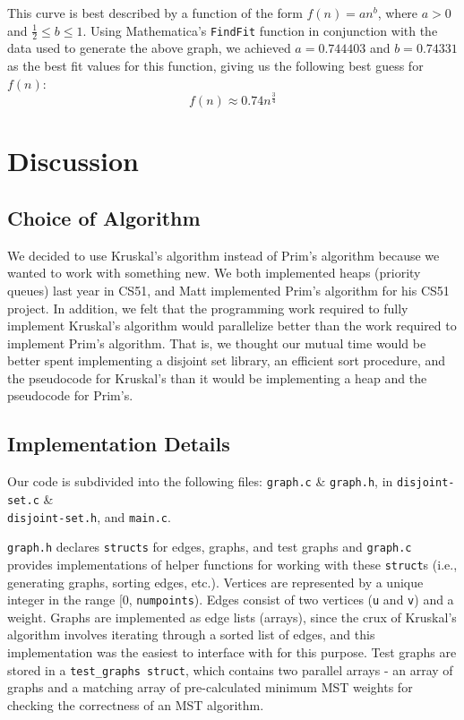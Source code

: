 \documentclass[solution, letterpaper]{cs121}
\begin{document}
This curve is best described by a function of the form $f(n)=an^b$, where $a > 0$ and $\frac{1}{2} \leq b \leq 1$. Using Mathematica's {\tt FindFit} function in conjunction with the data used to generate the above graph, we achieved $a=0.744403$ and $b=0.74331$ as the best fit values for this function, giving us the following best guess for $f(n)$:
\[f(n) \approx 0.74n^{\frac{3}{4}}\]

\section*{Discussion}
\subsection*{Choice of Algorithm}
\hspace{5mm} We decided to use Kruskal's algorithm instead of Prim's algorithm because we wanted to work with something new. We both implemented heaps (priority queues) last year in CS51, and Matt implemented Prim's algorithm for his CS51 project. In addition, we felt that the programming work required to fully implement Kruskal's algorithm would parallelize better than the work required to implement Prim's algorithm. That is, we thought our mutual time would be better spent implementing a disjoint set library, an efficient sort procedure, and the pseudocode for Kruskal's than it would be implementing a heap and the pseudocode for Prim's.

\subsection*{Implementation Details}
\hspace{5mm} Our code is subdivided into the following files: \texttt{graph.c} \& \texttt{graph.h}, in \texttt{disjoint-set.c} \& \\\texttt{disjoint-set.h}, and \texttt{main.c}.

\texttt{graph.h} declares \texttt{structs} for edges, graphs, and test graphs and \texttt{graph.c} provides implementations of helper functions for working with these \texttt{struct}s (i.e., generating graphs, sorting edges, etc.). Vertices are represented by a unique integer in the range [0, \texttt{numpoints}). Edges consist of two vertices (\texttt{u} and \texttt{v}) and a weight. Graphs are implemented as edge lists (arrays), since the crux of Kruskal's algorithm involves iterating through a sorted list of edges, and this implementation was the easiest to interface with for this purpose. Test graphs are stored in a \texttt{test\_graphs struct}, which contains two parallel arrays - an array of graphs and a matching array of pre-calculated minimum MST weights for checking the correctness of an MST algorithm.
\end{document}

